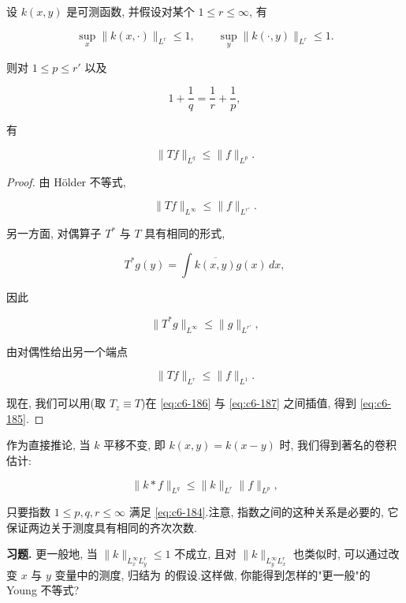 \begin{theorem}\label{thm:c6-1.10}
设 $k(x, y)$ 是可测函数, 并假设对某个 $1\le r\le\infty$, 有

\[
\sup_x\|k(x, \cdot)\|_{L^r} \le 1, \qquad \sup_y\|k(\cdot, y)\|_{L^r} \le 1.
\]

则对 $1\le p\le r'$ 以及

\begin{equation}
1 + \frac{1}{q} = \frac{1}{r} + \frac{1}{p}, \label{eq:c6-184}
\end{equation}

有

\begin{equation}
\|Tf\|_{L^q} \le \|f\|_{L^p}.\label{eq:c6-185}
\end{equation}
\end{theorem}

\begin{proof}
由 Hölder 不等式,

\begin{equation}
\|Tf\|_{L^\infty} \le \|f\|_{L^{r'}}.\label{eq:c6-186}
\end{equation}

另一方面, 对偶算子 $T^*$ 与 $T$ 具有相同的形式,

\[
T^*g(y) = \int \overline{k(x, y)}g(x)\, dx,
\]

因此

\[
\|T^*g\|_{L^\infty} \le \|g\|_{L^{r'}},
\]

由对偶性给出另一个端点

\begin{equation}
\|Tf\|_{L^r} \le \|f\|_{L^1}.\label{eq:c6-187}
\end{equation}

现在, 我们可以用(取 $T_z\equiv T$)在 \eqref{eq:c6-186} 与 \eqref{eq:c6-187} 之间插值, 得到 \eqref{eq:c6-185}.
\end{proof}

作为直接推论, 当 $k$ 平移不变, 即 $k(x, y) = k(x-y)$ 时, 我们得到著名的卷积估计:

\begin{equation}
\|k*f\|_{L^q} \le \|k\|_{L^r}\|f\|_{L^p}, \label{eq:c6-188}
\end{equation}

只要指数 $1\le p, q, r\le\infty$ 满足 \eqref{eq:c6-184}.注意, 指数之间的这种关系是必要的, 它保证两边关于测度具有相同的齐次次数.

\textbf{习题.} 更一般地, 当 $\|k\|_{L_x^\infty L_y^r}\le 1$ 不成立, 且对 $\|k\|_{L_y^\infty L_x^r}$ 也类似时, 可以通过改变 $x$ 与 $y$ 变量中的测度, 归结为 的假设.这样做, 你能得到怎样的"更一般"的 Young 不等式?

